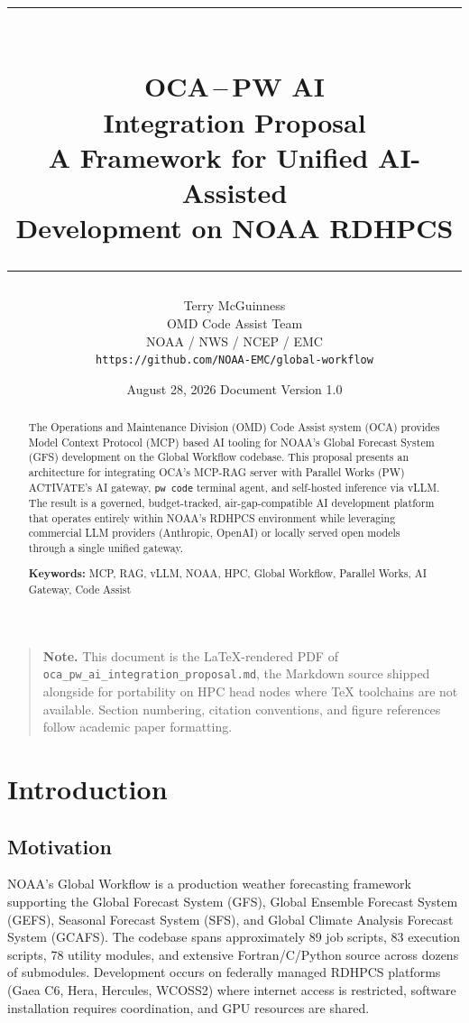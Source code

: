 \documentclass[11pt,letterpaper,twoside]{article}
\title{%
  \vspace{-0.5in}
  {\color{noaablue}\rule{\linewidth}{2pt}}\\[12pt]
  {\Huge\bfseries\color{noaadarkblue} OCA\,--\,PW AI\\[4pt] Integration Proposal}\\[10pt]
  {\Large\color{ocaslate} A Framework for Unified AI-Assisted\\[2pt] Development on NOAA RDHPCS}\\[12pt]
  {\color{noaablue}\rule{\linewidth}{2pt}}
}
\author{%
  Terry McGuinness\\[2pt]
  {\normalsize OMD Code Assist Team}\\[2pt]
  {\normalsize NOAA / NWS / NCEP / EMC}\\[2pt]
  {\small\texttt{https://github.com/NOAA-EMC/global-workflow}}
}
\date{August 28, 2026 \quad\textbullet\quad Document Version 1.0}
\newenvironment{notebox}%
  {\begin{quote}\color{noaadarkblue}\small\noindent\textbf{\color{noaablue}Note.}\hspace{0.4em}}%
  {\end{quote}}
\begin{document}
\maketitle
\thispagestyle{plain}

\begin{abstract}
\noindent
The Operations and Maintenance Division (OMD) Code Assist system (OCA)
provides Model Context Protocol (MCP) based AI tooling for NOAA's Global
Forecast System (GFS) development on the Global Workflow codebase. This
proposal presents an architecture for integrating OCA's MCP-RAG server with
Parallel Works (PW) ACTIVATE's AI gateway, \texttt{pw code} terminal agent,
and self-hosted inference via vLLM. The result is a governed, budget-tracked,
air-gap-compatible AI development platform that operates entirely within
NOAA's RDHPCS environment while leveraging commercial LLM providers
(Anthropic, OpenAI) or locally served open models through a single unified
gateway.

\vspace{6pt}
\noindent\textbf{Keywords:} MCP, RAG, vLLM, NOAA, HPC, Global Workflow,
Parallel Works, AI Gateway, Code Assist
\end{abstract}

\begin{notebox}
This document is the LaTeX-rendered PDF of
\texttt{oca\_pw\_ai\_integration\_proposal.md}, the Markdown source
shipped alongside for portability on HPC head nodes where TeX toolchains
are not available. Section numbering, citation conventions, and figure
references follow academic paper formatting.
\end{notebox}

\tableofcontents
\newpage

\section{Introduction}
\label{sec:intro}

\subsection{Motivation}

NOAA's Global Workflow is a production weather forecasting framework
supporting the Global Forecast System (GFS), Global Ensemble Forecast System
(GEFS), Seasonal Forecast System (SFS), and Global Climate Analysis Forecast
System (GCAFS). The codebase spans approximately 89 job scripts, 83 execution
scripts, 78 utility modules, and extensive Fortran/C/Python source across
dozens of submodules. Development occurs on federally managed RDHPCS
platforms (Gaea C6, Hera, Hercules, WCOSS2) where internet access is
restricted, software installation requires coordination, and GPU resources
are shared.
\end{document}
